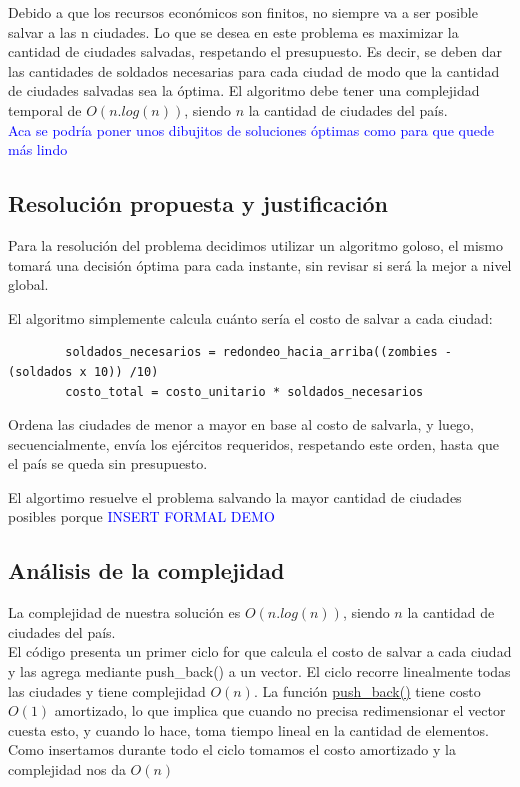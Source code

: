 \documentclass[a4paper]{article}
\begin{document}
Debido a que los recursos econ\'omicos son finitos, no siempre va a ser posible salvar a las n ciudades. Lo que se desea en este problema es maximizar la cantidad de ciudades salvadas, respetando el presupuesto. Es decir, se deben dar las cantidades de soldados necesarias para cada ciudad de modo que la cantidad de ciudades salvadas sea la \'optima.  El algoritmo debe tener una complejidad temporal de $O(n.log(n))$, siendo $n$ la cantidad de ciudades del pa\'is.\\

\textcolor{blue}{Aca se podr\'ia poner unos dibujitos de soluciones \'optimas como para que quede m\'as lindo}



\subsection{Resoluci\'on propuesta y justificaci\'on}

Para la resoluci\'on del problema decidimos utilizar un algoritmo goloso, el mismo tomar\'a una decisi\'on \'optima para cada instante, sin revisar si ser\'a la mejor a nivel global.

El algoritmo simplemente calcula cu\'anto ser\'ia el costo de salvar a cada ciudad:
	\begin{codesnippet}
	\begin{verbatim}
		soldados_necesarios = redondeo_hacia_arriba((zombies - (soldados x 10)) /10)
		costo_total = costo_unitario * soldados_necesarios
	\end{verbatim}
	\end{codesnippet}

Ordena las ciudades de menor a mayor en base al costo de salvarla, y luego, secuencialmente, env\'ia los ej\'ercitos requeridos, respetando este orden, hasta que el pa\'is se queda sin presupuesto.

El algortimo resuelve el problema salvando la mayor cantidad de ciudades posibles porque
\textcolor{blue}{INSERT FORMAL DEMO}

\subsection{An\'alisis de la complejidad}
La complejidad de nuestra soluci\'on es $O(n.log(n))$, siendo $n$ la cantidad de ciudades del pa\'is.\\

El c\'odigo presenta un primer ciclo for que calcula el costo de salvar a cada ciudad y las agrega mediante push_back() a un vector. El ciclo recorre linealmente todas las ciudades y tiene complejidad $O(n)$. La funci\'on \href{http://www.cplusplus.com/reference/vector/vector/push_back/}{push_back()} tiene costo $O(1)$ amortizado, lo que implica que cuando no precisa redimensionar el vector cuesta esto, y cuando lo hace, toma tiempo lineal en la cantidad de elementos. Como insertamos durante todo el ciclo tomamos el costo amortizado y la complejidad nos da $O(n)$
\end{document}
